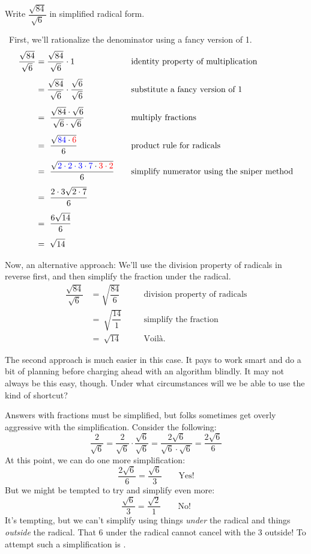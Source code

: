 \begin{boxex}
Write $\dfrac{\sqrt{84}}{\sqrt{6}}$ in simplified radical form.

\exsoln\ First, we'll rationalize the denominator using a fancy version of 1.
\[\begin{aligned}
\dfrac{\sqrt{84}}{\sqrt{6}} &= \dfrac{\sqrt{84}}{\sqrt{6}} \cdot 1
&&\quad\text{identity property of multiplication}
\\[1ex]
&= \dfrac{\sqrt{84}}{\sqrt{6}} \cdot \dfrac{\sqrt{6}}{\sqrt{6}}
&&\quad\text{substitute a fancy version of 1}
\\[1ex]
&=~ \dfrac{\sqrt{84} \cdot \sqrt{6}}{\sqrt{6} \cdot \sqrt{6}}
&&\quad\text{multiply fractions}
\\[1ex]
&=~ \dfrac{\sqrt{{\color{blue}84} \cdot {\color{red}6}}}{6}
&&\quad\text{product rule for radicals}
\\[1ex]
&=~ \dfrac{\sqrt{{\color{blue}2 \cdot 2 \cdot 3 \cdot 7} \cdot {\color{red}3 \cdot 2}}}{6}
&&\quad\text{simplify numerator using the sniper method}
\\[1ex]
&=~ \dfrac{2 \cdot 3 \sqrt{2 \cdot 7}}{6}
&&\quad\text{}
\\[1ex]
&=~ \dfrac{6 \sqrt{14}}{6}
&&\quad\text{}
\\[1ex]
&=~ \sqrt{14}
&&\quad\text{}\\
\end{aligned}
\]

Now, an alternative approach: We'll use the division property of radicals in reverse first, and then simplify the fraction under the radical.
\[\begin{aligned}
\dfrac{\sqrt{84}}{\sqrt{6}} &= \sqrt{\dfrac{84}{6}}
&&\quad\text{division property of radicals}
\\[1ex]
&=~ \sqrt{\dfrac{14}{1}}
&&\quad\text{simplify the fraction}
\\[1ex]
&=~ \sqrt{14}
&&\quad\text{Voil\`a.}
\end{aligned}
\]
\end{boxex}

The second approach is much easier in this case. It pays to work smart and do a bit of planning before charging ahead with an algorithm blindly. It may not always be this easy, though. Under what circumstances will we be able to use the kind of shortcut?

\begin{boxwarn}
Answers with fractions must be simplified, but folks sometimes get overly aggressive with the simplification. Consider the following: \[\frac{2}{\sqrt{6}} = \frac{2}{\sqrt{6}}\cdot\frac{\sqrt{6}}{\sqrt{6}} = \frac{2\sqrt{6}}{\sqrt{6}\cdot\sqrt{6}} = \frac{2\sqrt{6}}{6}\]
At this point, we can do one more simplification: \[\frac{2\sqrt{6}}{6} = \frac{\sqrt{6}}{3} \qquad \text{Yes!}\]
But we might be tempted to try and simplify even more: \[\frac{\sqrt{6}}{3} = \frac{\sqrt{2}}{1} \qquad \text{No!}\]
It's tempting, but we can't simplify using things \textit{under} the radical and things \textit{outside} the radical. That 6 under the radical cannot cancel with the 3 outside! To attempt such a simplification is \evilandwrong.
\end{boxwarn}

